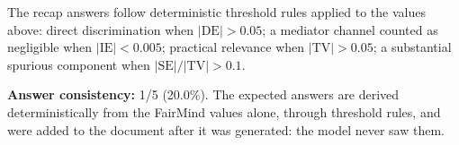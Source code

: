 \documentclass[11pt]{article}
\begin{document}
\vspace{1em}
\noindent\footnotesize
The recap answers follow deterministic threshold rules applied to the values above: direct discrimination when $|\mathrm{DE}| > 0.05$; a mediator channel counted as negligible when $|\mathrm{IE}| < 0.005$; practical relevance when $|\mathrm{TV}| > 0.05$; a substantial spurious component when $|\mathrm{SE}| / |\mathrm{TV}| > 0.1$.


\vspace{1em}
\noindent\textbf{Answer consistency:} 1/5 (20.0\%). The expected answers are derived deterministically from the FairMind values alone, through threshold rules, and were added to the document after it was generated: the model never saw them.
\end{document}

